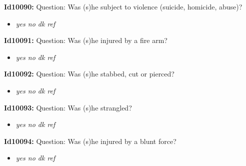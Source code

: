 \documentclass{article}%
\begin{document}
\textbf{Id10090: \newline%
}%
Question: Was (s)he subject to violence (suicide, homicide, abuse)?\newline%
%
\begin{itemize}%
\item%
\textit{yes\newline%
 no\newline%
 dk\newline%
 ref\newline%
}%
\end{itemize}%
\textbf{Id10091: \newline%
}%
Question: Was (s)he injured by a fire arm?\newline%
%
\begin{itemize}%
\item%
\textit{yes\newline%
 no\newline%
 dk\newline%
 ref\newline%
}%
\end{itemize}%
\textbf{Id10092: \newline%
}%
Question: Was (s)he stabbed, cut or pierced?\newline%
%
\begin{itemize}%
\item%
\textit{yes\newline%
 no\newline%
 dk\newline%
 ref\newline%
}%
\end{itemize}%
\textbf{Id10093: \newline%
}%
Question: Was (s)he strangled?\newline%
%
\begin{itemize}%
\item%
\textit{yes\newline%
 no\newline%
 dk\newline%
 ref\newline%
}%
\end{itemize}%
\textbf{Id10094: \newline%
}%
Question: Was (s)he injured by a blunt force?\newline%
%
\begin{itemize}%
\item%
\textit{yes\newline%
 no\newline%
 dk\newline%
 ref\newline%
}%
\end{itemize}%
\end{document}
